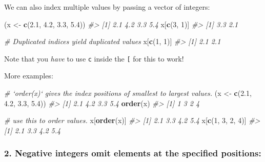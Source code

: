 \documentclass[]{book}
\newenvironment{Shaded}{\begin{snugshade}}{\end{snugshade}}
\newcommand{\KeywordTok}[1]{\textcolor[rgb]{0.13,0.29,0.53}{\textbf{#1}}}
\newcommand{\DecValTok}[1]{\textcolor[rgb]{0.00,0.00,0.81}{#1}}
\newcommand{\FloatTok}[1]{\textcolor[rgb]{0.00,0.00,0.81}{#1}}
\newcommand{\StringTok}[1]{\textcolor[rgb]{0.31,0.60,0.02}{#1}}
\newcommand{\CommentTok}[1]{\textcolor[rgb]{0.56,0.35,0.01}{\textit{#1}}}
\newcommand{\NormalTok}[1]{#1}
\begin{document}
We can also index multiple values by passing a vector of integers:

\begin{Shaded}
\begin{Highlighting}[]
\NormalTok{(x <-}\StringTok{ }\KeywordTok{c}\NormalTok{(}\FloatTok{2.1}\NormalTok{, }\FloatTok{4.2}\NormalTok{, }\FloatTok{3.3}\NormalTok{, }\FloatTok{5.4}\NormalTok{))}
\CommentTok{#> [1] 2.1 4.2 3.3 5.4}
\NormalTok{x[}\KeywordTok{c}\NormalTok{(}\DecValTok{3}\NormalTok{, }\DecValTok{1}\NormalTok{)]}
\CommentTok{#> [1] 3.3 2.1}

\CommentTok{# Duplicated indices yield duplicated values}
\NormalTok{x[}\KeywordTok{c}\NormalTok{(}\DecValTok{1}\NormalTok{, }\DecValTok{1}\NormalTok{)]}
\CommentTok{#> [1] 2.1 2.1}
\end{Highlighting}
\end{Shaded}

Note that you \emph{have} to use \texttt{c} inside the \texttt{{[}} for
this to work!

More examples:

\begin{Shaded}
\begin{Highlighting}[]
\CommentTok{# `order(x)` gives the index positions of smallest to largest values.}
\NormalTok{(x <-}\StringTok{ }\KeywordTok{c}\NormalTok{(}\FloatTok{2.1}\NormalTok{, }\FloatTok{4.2}\NormalTok{, }\FloatTok{3.3}\NormalTok{, }\FloatTok{5.4}\NormalTok{))}
\CommentTok{#> [1] 2.1 4.2 3.3 5.4}
\KeywordTok{order}\NormalTok{(x)}
\CommentTok{#> [1] 1 3 2 4}

\CommentTok{# use this to order values.}
\NormalTok{x[}\KeywordTok{order}\NormalTok{(x)]}
\CommentTok{#> [1] 2.1 3.3 4.2 5.4}
\NormalTok{x[}\KeywordTok{c}\NormalTok{(}\DecValTok{1}\NormalTok{, }\DecValTok{3}\NormalTok{, }\DecValTok{2}\NormalTok{, }\DecValTok{4}\NormalTok{)]}
\CommentTok{#> [1] 2.1 3.3 4.2 5.4}
\end{Highlighting}
\end{Shaded}

\subsubsection*{\texorpdfstring{2. \textbf{Negative integers} omit
elements at the specified
positions:}{2. Negative integers omit elements at the specified positions:}}\label{negative-integers-omit-elements-at-the-specified-positions}
\end{document}
